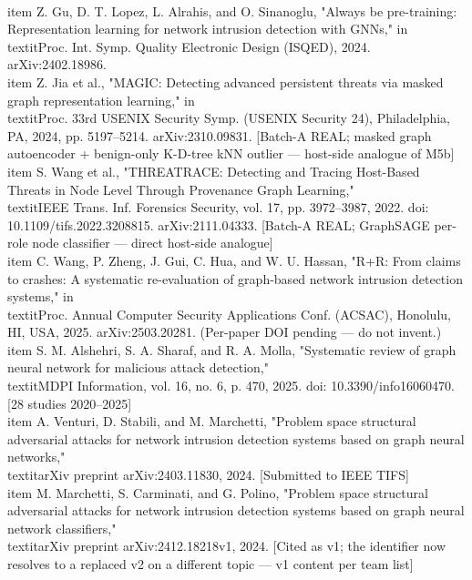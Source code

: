 \documentclass[12pt,a4paper,oneside]{report}
\begin{document}
\\item Z. Gu, D. T. Lopez, L. Alrahis, and O. Sinanoglu, "Always be pre-training: Representation learning for network intrusion detection with GNNs," in \\textit{Proc. Int. Symp. Quality Electronic Design (ISQED)}, 2024. arXiv:2402.18986.
\\item Z. Jia et al., "MAGIC: Detecting advanced persistent threats via masked graph representation learning," in \\textit{Proc. 33rd USENIX Security Symp. (USENIX Security 24)}, Philadelphia, PA, 2024, pp. 5197–5214. arXiv:2310.09831. [Batch-A REAL; masked graph autoencoder + benign-only K-D-tree kNN outlier — host-side analogue of M5b]
\\item S. Wang et al., "THREATRACE: Detecting and Tracing Host-Based Threats in Node Level Through Provenance Graph Learning," \\textit{IEEE Trans. Inf. Forensics Security}, vol. 17, pp. 3972–3987, 2022. doi: 10.1109/tifs.2022.3208815. arXiv:2111.04333. [Batch-A REAL; GraphSAGE per-role node classifier — direct host-side analogue]
\\item C. Wang, P. Zheng, J. Gui, C. Hua, and W. U. Hassan, "R+R: From claims to crashes: A systematic re-evaluation of graph-based network intrusion detection systems," in \\textit{Proc. Annual Computer Security Applications Conf. (ACSAC)}, Honolulu, HI, USA, 2025. arXiv:2503.20281. (Per-paper DOI pending — do not invent.)
\\item S. M. Alshehri, S. A. Sharaf, and R. A. Molla, "Systematic review of graph neural network for malicious attack detection," \\textit{MDPI Information}, vol. 16, no. 6, p. 470, 2025. doi: 10.3390/info16060470. [28 studies 2020–2025]
\\item A. Venturi, D. Stabili, and M. Marchetti, "Problem space structural adversarial attacks for network intrusion detection systems based on graph neural networks," \\textit{arXiv preprint arXiv:2403.11830}, 2024. [Submitted to IEEE TIFS]
\\item M. Marchetti, S. Carminati, and G. Polino, "Problem space structural adversarial attacks for network intrusion detection systems based on graph neural network classifiers," \\textit{arXiv preprint arXiv:2412.18218v1}, 2024. [Cited as v1; the identifier now resolves to a replaced v2 on a different topic — v1 content per team list]
\end{document}
